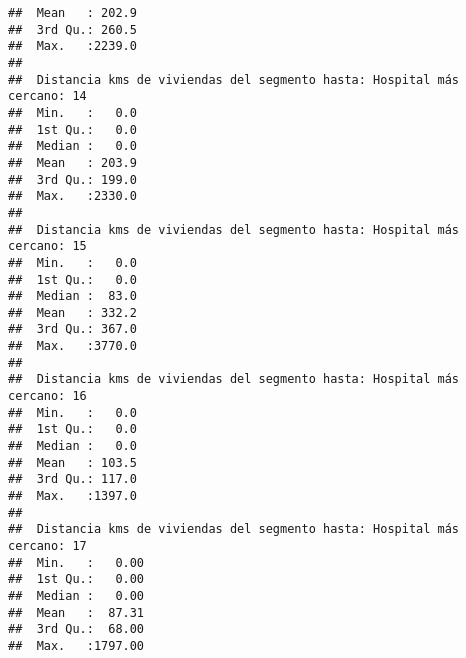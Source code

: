 \documentclass[11pt,]{article}
\begin{document}
\begin{verbatim}
##  Mean   : 202.9                                                         
##  3rd Qu.: 260.5                                                         
##  Max.   :2239.0                                                         
##                                                                         
##  Distancia kms de viviendas del segmento hasta: Hospital más cercano: 14
##  Min.   :   0.0                                                         
##  1st Qu.:   0.0                                                         
##  Median :   0.0                                                         
##  Mean   : 203.9                                                         
##  3rd Qu.: 199.0                                                         
##  Max.   :2330.0                                                         
##                                                                         
##  Distancia kms de viviendas del segmento hasta: Hospital más cercano: 15
##  Min.   :   0.0                                                         
##  1st Qu.:   0.0                                                         
##  Median :  83.0                                                         
##  Mean   : 332.2                                                         
##  3rd Qu.: 367.0                                                         
##  Max.   :3770.0                                                         
##                                                                         
##  Distancia kms de viviendas del segmento hasta: Hospital más cercano: 16
##  Min.   :   0.0                                                         
##  1st Qu.:   0.0                                                         
##  Median :   0.0                                                         
##  Mean   : 103.5                                                         
##  3rd Qu.: 117.0                                                         
##  Max.   :1397.0                                                         
##                                                                         
##  Distancia kms de viviendas del segmento hasta: Hospital más cercano: 17
##  Min.   :   0.00                                                        
##  1st Qu.:   0.00                                                        
##  Median :   0.00                                                        
##  Mean   :  87.31                                                        
##  3rd Qu.:  68.00                                                        
##  Max.   :1797.00                                                        

\end{verbatim}
\end{document}
